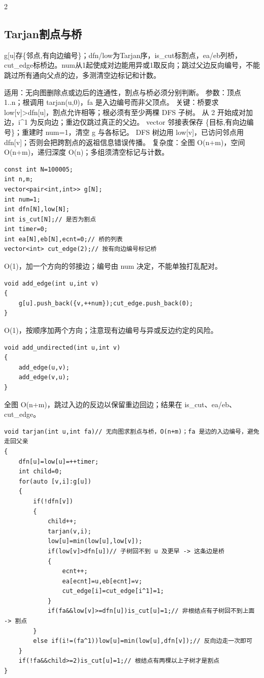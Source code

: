\documentclass[UTF8,fontset=fandol,a4paper,twoside]{ctexart}
\newcommand{\note}[1]{{\fontsize{10}{12}\selectfont #1\par}}
\begin{document}
\begin{multicols}{2}
\subsection{Tarjan割点与桥}

\note{g[\allowbreak{}u]\allowbreak{}存\{邻点,\allowbreak{}有向边编号\}；dfn/\allowbreak{}low为Tarjan序，is\_cut标割点，ea/\allowbreak{}eb列桥，cut\_edge标桥边。num从1起使成对边能用异或1取反向；跳过父边反向编号，不能跳过所有通向父点的边，多测清空边标记和计数。}
\note{适用：无向图删除点或边后的连通性，割点与桥必须分别判断。 参数：顶点 1.\allowbreak{}.\allowbreak{}n；根调用 tarjan(\allowbreak{}u,\allowbreak{}0)\allowbreak{}，fa 是入边编号而非父顶点。 关键：桥要求 low[\allowbreak{}v]\allowbreak{}>\allowbreak{}dfn[\allowbreak{}u]\allowbreak{}，割点允许相等；根必须有至少两棵 DFS 子树。 从 2 开始成对加边，i\textasciicircum{}1 为反向边；重边仅跳过真正的父边。 vector 邻接表保存 \{目标,\allowbreak{}有向边编号\}；重建时 num=\allowbreak{}1，清空 g 与各标记。 DFS 树边用 low[\allowbreak{}v]\allowbreak{}，已访问邻点用 dfn[\allowbreak{}v]\allowbreak{}；否则会把跨割点的返祖信息错误传播。 复杂度：全图 O(\allowbreak{}n+\allowbreak{}m)\allowbreak{}，空间 O(\allowbreak{}n+\allowbreak{}m)\allowbreak{}，递归深度 O(\allowbreak{}n)\allowbreak{}；多组须清空标记与计数。}
\begin{lstlisting}
const int N=100005;
int n,m;
vector<pair<int,int>> g[N];
int num=1;
int dfn[N],low[N];
int is_cut[N];// 是否为割点
int timer=0;
int ea[N],eb[N],ecnt=0;// 桥的列表
vector<int> cut_edge(2);// 按有向边编号标记桥
\end{lstlisting}
\note{O(\allowbreak{}1)\allowbreak{}，加一个方向的邻接边；编号由 num 决定，不能单独打乱配对。}
\begin{lstlisting}
void add_edge(int u,int v)
{
    g[u].push_back({v,++num});cut_edge.push_back(0);
}
\end{lstlisting}
\note{O(\allowbreak{}1)\allowbreak{}，按顺序加两个方向；注意现有边编号与异或反边约定的风险。}
\begin{lstlisting}
void add_undirected(int u,int v)
{
    add_edge(u,v);
    add_edge(v,u);
}
\end{lstlisting}
\note{全图 O(\allowbreak{}n+\allowbreak{}m)\allowbreak{}，跳过入边的反边以保留重边回边；结果在 is\_cut、ea/\allowbreak{}eb、cut\_edge。}
\begin{lstlisting}
void tarjan(int u,int fa)// 无向图求割点与桥，O(n+m)；fa 是边的入边编号，避免走回父亲
{
    dfn[u]=low[u]=++timer;
    int child=0;
    for(auto [v,i]:g[u])
    {
        if(!dfn[v])
        {
            child++;
            tarjan(v,i);
            low[u]=min(low[u],low[v]);
            if(low[v]>dfn[u])// 子树回不到 u 及更早 -> 这条边是桥
            {
                ecnt++;
                ea[ecnt]=u,eb[ecnt]=v;
                cut_edge[i]=cut_edge[i^1]=1;
            }
            if(fa&&low[v]>=dfn[u])is_cut[u]=1;// 非根结点有子树回不到上面 -> 割点
        }
        else if(i!=(fa^1))low[u]=min(low[u],dfn[v]);// 反向边走一次即可
    }
    if(!fa&&child>=2)is_cut[u]=1;// 根结点有两棵以上子树才是割点
}
\end{lstlisting}

\end{multicols}
\end{document}
